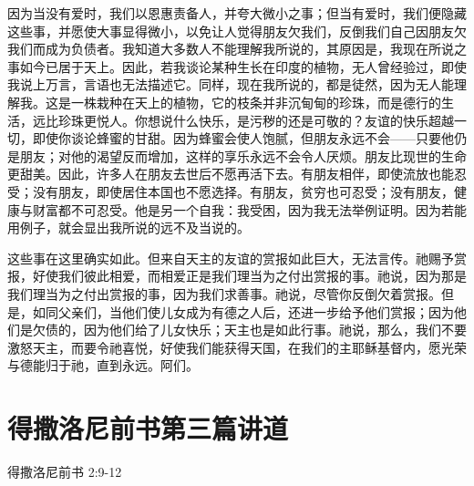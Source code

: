 因为当没有爱时，我们以恩惠责备人，并夸大微小之事；但当有爱时，我们便隐藏这些事，并愿使大事显得微小，以免让人觉得朋友欠我们，反倒我们自己因朋友欠我们而成为负债者。我知道大多数人不能理解我所说的，其原因是，我现在所说之事如今已居于天上。因此，若我谈论某种生长在印度的植物，无人曾经验过，即使我说上万言，言语也无法描述它。同样，现在我所说的，都是徒然，因为无人能理解我。这是一株栽种在天上的植物，它的枝条并非沉甸甸的珍珠，而是德行的生活，远比珍珠更悦人。你想说什么快乐，是污秽的还是可敬的？友谊的快乐超越一切，即使你谈论蜂蜜的甘甜。因为蜂蜜会使人饱腻，但朋友永远不会——只要他仍是朋友；对他的渴望反而增加，这样的享乐永远不会令人厌烦。朋友比现世的生命更甜美。因此，许多人在朋友去世后不愿再活下去。有朋友相伴，即使流放也能忍受；没有朋友，即使居住本国也不愿选择。有朋友，贫穷也可忍受；没有朋友，健康与财富都不可忍受。他是另一个自我：我受困，因为我无法举例证明。因为若能用例子，就会显出我所说的远不及当说的。\par

这些事在这里确实如此。但来自天主的友谊的赏报如此巨大，无法言传。祂赐予赏报，好使我们彼此相爱，而相爱正是我们理当为之付出赏报的事。祂说，因为那是我们理当为之付出赏报的事，因为我们求善事。祂说，尽管你反倒欠着赏报。但是，如同父亲们，当他们使儿女成为有德之人后，还进一步给予他们赏报；因为他们是欠债的，因为他们给了儿女快乐；天主也是如此行事。祂说，那么，我们不要激怒天主，而要令祂喜悦，好使我们能获得天国，在我们的主耶稣基督内，愿光荣与德能归于祂，直到永远。阿们。\par



\section{得撒洛尼前书第三篇讲道}

得撒洛尼前书 2:9-12\par

\par

